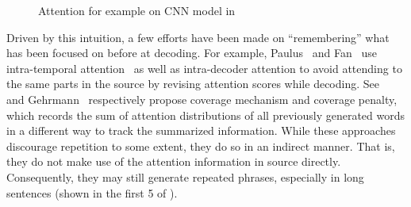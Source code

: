 \begin{figure}[th!]
\centering
{}
\quad
{}
\quad
{}
\caption{Attention for example on \DIFaddbeginFL {}\DIFaddendFL CNN model in }
\label{fig:attn_map}
\end{figure}

Driven by this intuition, a few efforts have been made on ``remembering''
what has been focused on before at decoding. 
For example, 
Paulus~\cite{PaulusXS17} and 
Fan~\cite{FanGA18} use intra-temporal 
attention~\cite{NallapatiZSGX16} as well as intra-decoder attention to avoid
attending to the same parts in the source by 
revising attention scores while decoding. 
See~\cite{SeeLM17} and Gehrmann~\cite{GehrmannDR18}
respectively propose coverage mechanism and coverage penalty,
which records the sum of attention distributions of all previously generated words 
in a different way to track the summarized information.  
While these approaches discourage repetition to some extent,
they do so in an indirect manner. That is, they do not 
make use of the attention information in source directly.
Consequently, they may still generate repeated phrases, 
especially in long sentences (shown in the first 5 \DIFdelbegin {}\DIFdelend \DIFaddbegin {}\DIFaddend of
).


